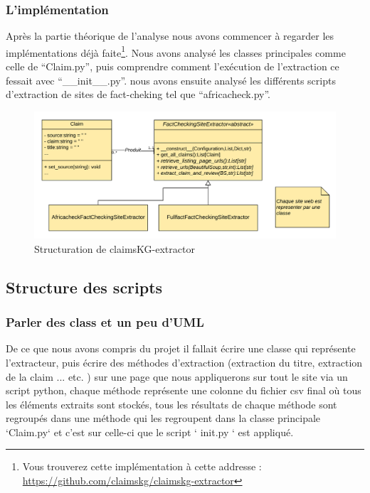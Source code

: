 \documentclass[oneside,13pt,a4paper]{report}
\begin{document}
\subsubsection*{L'implémentation}

Après la partie théorique de l'analyse nous avons commencer à regarder les implémentations déjà faite\footnote{Vous trouverez cette implémentation à cette addresse : \url{https://github.com/claimskg/claimskg-extractor}}. Nous avons analysé les classes principales comme celle de \enquote{Claim.py}, puis comprendre comment l'exécution de l'extraction ce fessait avec \enquote{\_\_init\_\_.py}. nous avons ensuite analysé les différents scripts d'extraction de sites de fact-cheking tel que \enquote{africacheck.py}.

\begin{figure}[h]
	\centering
	\begin{minipage}[c]{.8\linewidth}
		\includegraphics[width=1\textwidth]{img/claimsKG-extractor-uml.png}
		\caption{Structuration de claimsKG-extractor}
	\end{minipage}
\end{figure}


\subsection{Structure des scripts}
\subsubsection*{Parler des class et un peu d'UML}

De ce que nous avons compris du projet il fallait écrire une classe qui représente l'extracteur, puis écrire des méthodes d'extraction (extraction du titre, extraction de la claim ... etc. ) sur une page que nous appliquerons sur tout le site via un script python, chaque méthode représente une colonne du fichier csv final où tous les éléments extraits sont stockés, tous les résultats de chaque méthode sont regroupés dans une méthode qui les regroupent dans la classe principale `Claim.py` et c'est sur celle-ci que le script ` init.py ` est appliqué.
\end{document}
